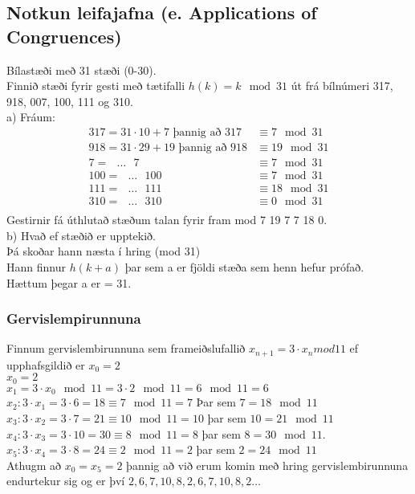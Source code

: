 \subsection{Notkun leifajafna (e. Applications of Congruences)}
Bílastæði með 31 stæði (0-30). \\Finnið stæði fyrir gesti með tætifalli $h(k) = k \mod 31$ út frá bílnúmeri 317, 918, 007, 100, 111 og 310.\\
a) Fráum:
\begin{align*}
    317 = 31 \cdot 10 + 7 \text{ þannig að } 317 &\equiv 7 \mod 31\\
    918 = 31 \cdot 29 + 19 \text{ þannig að } 918 &\equiv 19 \mod 31\\
    7 = \text{ } \ldots \text{ } 7 &\equiv 7 \mod 31\\
    100 = \text{ } \ldots \text{ } 100 &\equiv 7 \mod 31\\
    111 = \text{ } \ldots \text{ } 111 &\equiv 18 \mod 31\\
    310 = \text{ } \ldots \text{ } 310 &\equiv 0 \mod 31\\
\end{align*} Gestirnir fá úthlutað stæðum talan fyrir fram mod 7 19 7 7 18 0.\\
b) Hvað ef stæðið er upptekið.\\
Þá skoðar hann næsta í hring (mod 31)\\
Hann finnur $h(k+a)$ þar sem a er fjöldi stæða sem henn hefur prófað.\\
Hættum þegar a er = 31.
\subsubsection{Gervislempirunnuna}
Finnum gervislembirunnuna sem frameiðslufallið $x_{n+1} = 3 \cdot x_n mod 11$ ef upphafsgildið er $x_0 = 2$\\
$x_0 = 2$\\
$x_1 = 3 \cdot x_0 \mod 11 = 3 \cdot 2 \mod 11 = 6 \mod 11 = 6$\\
$x_2 : 3 \cdot x_1 = 3 \cdot 6 = 18 \equiv 7 \mod 11 = 7$ Þar sem $7 = 18 \mod 11$\\
$x_3 : 3 \cdot x_2 = 3 \cdot 7 = 21 \equiv 10 \mod 11 = 10$ þar sem $10 = 21 \mod 11$ \\
$x_4 : 3 \cdot x_3 = 3 \cdot 10 = 30 \equiv 8 \mod 11 = 8$ þar sem $8 = 30 \mod 11$.\\
$x_5 : 3 \cdot x_4 = 3 \cdot 8 = 24 \equiv 2 \mod 11 = 2$ þar sem $2 = 24 \mod 11$\\
Athugm að $x_0 = x_5 = 2$ þannig að við erum komin með hring gervislembirunnuna endurtekur sig og er því $2,6,7,10,8,2,6,7,10,8,2 \ldots$\\
\newpage